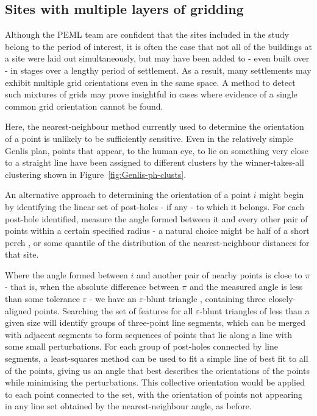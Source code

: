 \documentclass[../../ArchStats.tex]{subfiles}
\begin{document}
\subsection{Sites with multiple layers of gridding}
Although the PEML team are confident that the sites included in the study belong to the period of interest, it is often the case that not all of the buildings at a site were laid out simultaneously, but may have been added to - even built over - in stages over a lengthy period of settlement. As a result, many settlements may exhibit multiple grid orientations even in the same space. A method to detect such mixtures of grids may prove insightful in cases where evidence of a single common grid orientation cannot be found.

Here, the nearest-neighbour method currently used to determine the orientation of a point is unlikely to be sufficiently sensitive. Even in the relatively simple Genlis plan, points that appear, to the human eye, to lie on something very close to a straight line have been assigned to different clusters by the winner-takes-all clustering shown in Figure~\ref{fig:Genlis-ph-clusts}. 

An alternative approach to determining the orientation of a point $i$ might begin by identifying the linear set of post-holes - if any - to which it belongs. For each post-hole identified, measure the angle formed between it and every other pair of points within a certain specified radius - a natural choice might be half of a short perch \cite{Blair2013, Kendall2013}, or some quantile of the distribution of the nearest-neighbour distances for that site.

Where the angle formed between $i$ and  another pair of nearby points is close to $\pi$ - that is, when the absolute difference between $\pi$ and the measured angle is less than some tolerance $\varepsilon$ - we have an $\varepsilon$-blunt triangle  \cite{Kendall1980}, containing three closely-aligned points. Searching the set of features for all $\varepsilon$-blunt triangles of less than a given size will identify groups of three-point line segments, which can be merged with adjacent segments to form sequences of points that lie along a line with some small perturbations. For each group of post-holes  connected by line segments, a least-squares method can be used to fit a simple line of best fit to all of the points, giving us an angle that best describes the orientations of the points while minimising the perturbations. This collective orientation would be applied to each point connected to the set, with the orientation of points not appearing in any line set obtained by the nearest-neighbour angle, as before.
\end{document}
